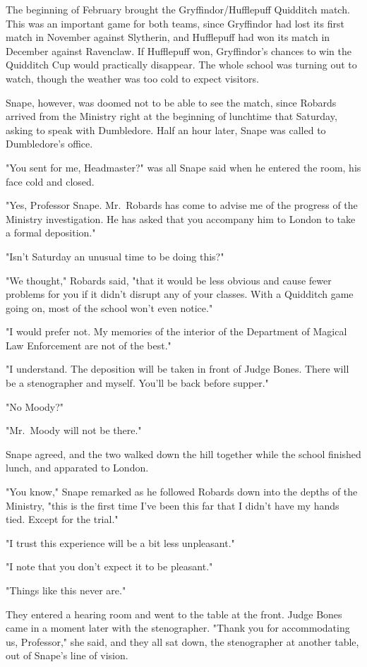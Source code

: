 The beginning of February brought the Gryffindor\slash Hufflepuff Quidditch match. This was an important game for both teams, since Gryffindor had lost its first match in November against Slytherin, and Hufflepuff had won its match in December against Ravenclaw. If Hufflepuff won, Gryffindor's chances to win the Quidditch Cup would practically disappear. The whole school was turning out to watch, though the weather was too cold to expect visitors.

Snape, however, was doomed not to be able to see the match, since Robards arrived from the Ministry right at the beginning of lunchtime that Saturday, asking to speak with Dumbledore. Half an hour later, Snape was called to Dumbledore's office.

"You sent for me, Headmaster?" was all Snape said when he entered the room, his face cold and closed.

"Yes, Professor Snape. Mr.~Robards has come to advise me of the progress of the Ministry investigation. He has asked that you accompany him to London to take a formal deposition."

"Isn't Saturday an unusual time to be doing this?"

"We thought," Robards said, "that it would be less obvious and cause fewer problems for you if it didn't disrupt any of your classes. With a Quidditch game going on, most of the school won't even notice."

"I would prefer not. My memories of the interior of the Department of Magical Law Enforcement are not of the best."

"I understand. The deposition will be taken in front of Judge Bones. There will be a stenographer and myself. You'll be back before supper."

"No Moody?"

"Mr.~Moody will not be there."

Snape agreed, and the two walked down the hill together while the school finished lunch, and apparated to London.

"You know," Snape remarked as he followed Robards down into the depths of the Ministry, "this is the first time I've been this far that I didn't have my hands tied. Except for the trial."

"I trust this experience will be a bit less unpleasant."

"I note that you don't expect it to be pleasant."

"Things like this never are."

They entered a hearing room and went to the table at the front. Judge Bones came in a moment later with the stenographer. "Thank you for accommodating us, Professor," she said, and they all sat down, the stenographer at another table, out of Snape's line of vision.

